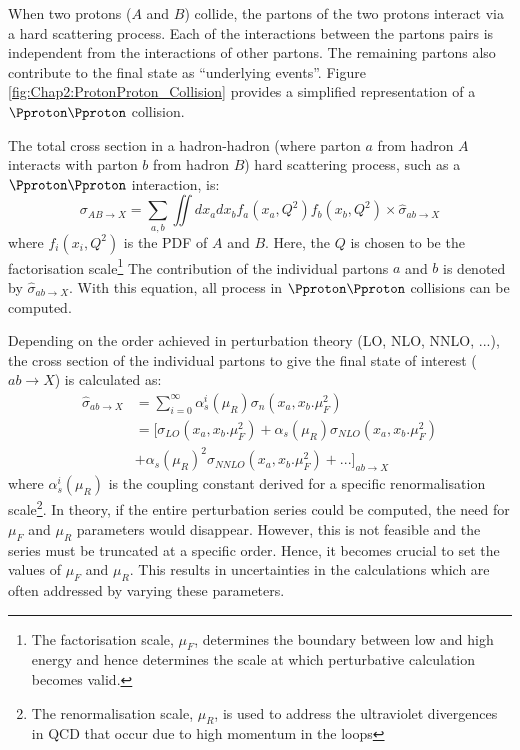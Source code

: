 When two protons ($A$ and $B$) collide, the partons of the two protons interact via a hard
scattering process. Each of the interactions between the partons pairs  is independent 
from the interactions of other partons. The remaining partons also contribute to the final state as ``underlying events''.  
Figure \ref{fig:Chap2:ProtonProton_Collision} provides a simplified representation of a $\Pproton \Pproton$ collision.

The total cross section in a hadron-hadron (where parton $a$ from hadron $A$ interacts with parton $b$ from 
hadron $B$) hard scattering process, such as a $\Pproton \Pproton$ interaction, is:
\begin{equation}
	\sigma_{AB \rightarrow X} = \sum_{a, b} \iint dx_{a} dx_{b} f_{a}(x_{a}, Q^{2})  f_{b}(x_{b}, Q^{2}) \times \hat{\sigma}_{ab\rightarrow X}
\end{equation}
where $f_{i}(x_{i}, Q^{2})$ is the PDF of $A$ and $B$.
Here, the $Q$ is chosen to be the factorisation scale\footnote{The 
factorisation scale, $\mu_{F}$, determines the boundary between low and high energy and 
hence determines the scale at which perturbative calculation becomes valid.}
The contribution of the individual partons $a$ and $b$ is denoted by  $\hat{\sigma}_{ab\rightarrow X}$.  
With this equation, all process in $\Pproton \Pproton$  collisions can be computed. 


Depending on the order achieved in perturbation theory (LO, NLO, NNLO, ...), the cross section 
of the individual partons to give the final state of interest
($ab \rightarrow X$) is calculated as:
\begin{align*}
	\hat{\sigma}_{ab\rightarrow X} 	&= \sum_{i=0}^{\infty} \alpha_{s}^{i}(\mu_{R}) \sigma_{n}(x_{a}, x_{b}. \mu_{F}^{2}) \\ 
							&=[\sigma_{LO}(x_{a}, x_{b}. \mu_{F}^{2}) + \alpha_{s}(\mu_{R}) \sigma_{NLO}(x_{a}, x_{b}. \mu_{F}^{2})  \\
							&+ \alpha_{s}(\mu_{R})^{2} \sigma_{NNLO}(x_{a}, x_{b}. \mu_{F}^{2}) + ...]_{ab\rightarrow X}
\end{align*}
where $\alpha_{s}^{i}(\mu_{R})$ is the coupling constant derived for a specific renormalisation scale\footnote{The 
renormalisation scale, $\mu_{R}$, is used to address the ultraviolet divergences in QCD that occur due to high 
momentum in the loops}. 
In theory, if the entire perturbation series could be computed, the need for $\mu_{F}$ and $\mu_{R}$ parameters 
would disappear. However, this is not feasible and the series must be truncated at a specific order. Hence, it 
becomes crucial to set the values of $\mu_{F}$ and $\mu_{R}$. This results in uncertainties in the calculations 
which are often addressed by varying these parameters.

